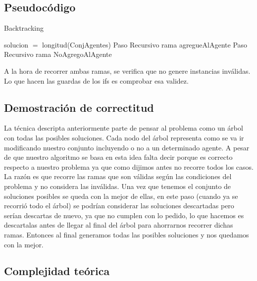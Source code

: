 \subsection{Pseudocódigo}

\begin{algorithm}[H]
\caption{Backtracking}\label{Ej1}

\begin{algorithmic}[H]
\State solucion $=$ longitud(ConjAgentes)
\EndIf
\EndIf
{}
\State Paso Recursivo rama agregueAlAgente
\EndIf
{}
\State Paso Recursivo rama NoAgregoAlAgente
\EndIf
\EndProcedure
\end{algorithmic}
\end{algorithm}

	A la hora de recorrer ambas ramas, se verifica que no genere instancias inválidas. Lo que hacen las guardas de los ifs es comprobar esa validez.
\subsection{Demostración de correctitud}

	La técnica descripta anteriormente parte de pensar al problema como un árbol con todas las posibles soluciones. Cada nodo del árbol representa como se va ir modificando nuestro conjunto incluyendo o no a un determinado agente. A pesar de que nuestro algoritmo se basa en esta idea falta decir porque es correcto respecto a nuestro problema ya que como dijimos antes no recorre todos los casos. La razón es que recorre las ramas que son válidas según las condiciones del problema y no considera las inválidas. Una vez que tenemos el conjunto de soluciones posibles se queda con la mejor de ellas, en este paso (cuando ya se recorrió todo el árbol) se podrían considerar las soluciones descartadas pero serían descartas de nuevo, ya que no cumplen con lo pedido, lo que hacemos es descartalas antes de llegar al final del árbol para ahorrarnos recorrer dichas ramas. Entonces al final generamos todas las posibles soluciones y nos quedamos con la mejor.

\subsection{Complejidad teórica}
	
